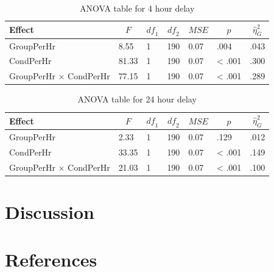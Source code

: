 \documentclass[man]{apa6}
\begin{document}
\begin{table}[tbp]
\begin{center}
\begin{threeparttable}
\caption{\label{tab:secondanova}ANOVA table for 4 hour delay}
\begin{tabular}{lllllll}
\toprule
Effect & \multicolumn{1}{c}{$F$} & \multicolumn{1}{c}{$\mathit{df}_1$} & \multicolumn{1}{c}{$\mathit{df}_2$} & \multicolumn{1}{c}{$\mathit{MSE}$} & \multicolumn{1}{c}{$p$} & \multicolumn{1}{c}{$\hat{\eta}^2_G$}\\
\midrule
GroupPerHr & 8.55 & 1 & 190 & 0.07 & .004 & .043\\
CondPerHr & 81.33 & 1 & 190 & 0.07 & < .001 & .300\\
GroupPerHr $\times$ CondPerHr & 77.15 & 1 & 190 & 0.07 & < .001 & .289\\
\bottomrule
\end{tabular}
\end{threeparttable}
\end{center}
\end{table}

\begin{table}[tbp]
\begin{center}
\begin{threeparttable}
\caption{\label{tab:secondanova24}ANOVA table for 24 hour delay}
\begin{tabular}{lllllll}
\toprule
Effect & \multicolumn{1}{c}{$F$} & \multicolumn{1}{c}{$\mathit{df}_1$} & \multicolumn{1}{c}{$\mathit{df}_2$} & \multicolumn{1}{c}{$\mathit{MSE}$} & \multicolumn{1}{c}{$p$} & \multicolumn{1}{c}{$\hat{\eta}^2_G$}\\
\midrule
GroupPerHr & 2.33 & 1 & 190 & 0.07 & .129 & .012\\
CondPerHr & 33.35 & 1 & 190 & 0.07 & < .001 & .149\\
GroupPerHr $\times$ CondPerHr & 21.03 & 1 & 190 & 0.07 & < .001 & .100\\
\bottomrule
\end{tabular}
\end{threeparttable}
\end{center}
\end{table}

\section{Discussion}\label{discussion}

\newpage

\section{References}\label{references}
\end{document}
